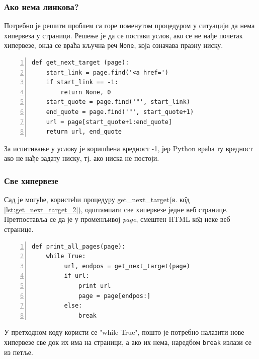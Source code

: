 		\subsubsection{Ако нема линкова?}
		Потребно је решити проблем са горе поменутом процедуром у ситуацији да нема хипервеза у страници. Решење је да се постави услов, ако се не нађе почетак хипервезе, онда се враћа кључна реч \lstinline{None}, која означава празну ниску. 
		\begin{lstlisting}[caption = Испитивање да ли страница садржи хипервезу, label={lst:get_next_target_2}, numbers = left]
def get_next_target (page):
    start_link = page.find('<a href=')
    if start_link == -1:
        return None, 0
    start_quote = page.find('"', start_link)
    end_quote = page.find('"', start_quote+1)
    url = page[start_quote+1:end_quote]
    return url, end_quote
		\end{lstlisting}
		За испитивање у услову је коришћена вредност -1, јер Python враћа ту вредност ако не нађе задату ниску, тј. ако ниска не постоји.
		\subsubsection{Све хипервезе}
		Сад је могуће, користећи процедуру get\_next\_target(в. к\^{о}д \ref{lst:get_next_target_2}), одштампати све хипервезе једне веб странице. Претпоставља се да је у променљивој \emph{page}, смештен HTML к\^{о}д неке веб странице.
		\begin{lstlisting}[caption=Процедура штампања свих хипервеза, label={lst:print_all_links}, numbers = left	]
def print_all_pages(page):
    while True:
         url, endpos = get_next_target(page)
         if url:
             print url
             page = page[endpos:]
         else:
             break
		\end{lstlisting}
        У претходном коду користи се "while True", пошто је потребно налазити нове хипервезе све док их има на страници, а ако их нема, наредбом \lstinline{break} излази се из петље.